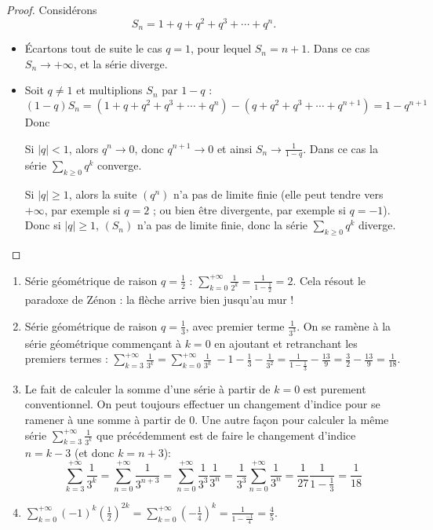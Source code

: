 \documentclass[class=report,crop=false]{standalone}
\begin{document}
\begin{proof}

Considérons 
$$S_n=1+q+q^2+q^3+\cdots+q^n.$$

\begin{itemize}
  \item \'Ecartons tout de suite le cas $q=1$, pour lequel $S_n = n+1$.
Dans ce cas $S_n \to +\infty$, et la série diverge.
  
  \item Soit $q \neq 1$ et multiplions $S_n$ par $1-q$ :
$$(1-q)S_n=(1+q+q^2+q^3+\cdots+q^n)-(q+q^2+q^3+\cdots+q^{n+1})=1-q^{n+1}$$
Donc

Si $|q|<1$, alors $q^n \to 0$, donc $q^{n+1} \to 0$ et ainsi $S_n \to \frac{1}{1-q}$.
Dans ce cas la série $\sum_{k \ge 0} q^k$ converge.

Si $|q| \ge 1$, alors la suite $(q^n)$ n'a pas de limite finie
(elle peut tendre vers $+\infty$, par exemple si $q=2$ ;
ou bien être divergente, par exemple si $q=-1$).
Donc si $|q| \ge 1$, $(S_n)$ n'a pas de limite finie, donc la série 
$\sum_{k \ge 0} q^k$ diverge.
\end{itemize}
\end{proof}


\begin{exemple}
\begin{enumerate}
  \item Série géométrique de raison $q=\frac 12$ : \quad 
  $\displaystyle \sum_{k=0}^{+\infty} \frac{1}{2^k} = \frac{1}{1-\frac12} = 2$.
  Cela résout le paradoxe de Zénon : la flèche arrive bien jusqu'au mur !

  
  \item Série géométrique de raison $q=\frac 13$, avec premier terme $\frac{1}{3^3}$. 
  On se ramène à la série géométrique commençant à $k=0$ en ajoutant et retranchant les premiers termes :
  $\displaystyle \sum_{k=3}^{+\infty} \frac{1}{3^k} = \sum_{k=0}^{+\infty} \frac{1}{3^k} \  -  1 - \frac 13-\frac 1{3^2} 
  = \frac{1}{1-\frac13} - \frac{13}{9}= \frac32-\frac{13}{9} = \frac{1}{18}$.
  
  \item Le fait de calculer la somme d'une série à partir de $k=0$ est
purement conventionnel. On peut toujours effectuer un changement
d'indice pour se ramener à une somme à partir de $0$. Une autre façon pour calculer la même série 
$\displaystyle \sum_{k=3}^{+\infty} \frac{1}{3^k}$ que précédemment
est de faire le changement d'indice $n=k-3$ (et donc $k=n+3$):
$$\sum_{k=3}^{+\infty} \frac{1}{3^k} 
= \sum_{n=0}^{+\infty} \frac{1}{3^{n+3}}
= \sum_{n=0}^{+\infty} \frac{1}{3^3}\frac{1}{3^n}
= \frac{1}{3^3}\sum_{n=0}^{+\infty} \frac{1}{3^n}
= \frac{1}{27}\frac{1}{1-\frac13}
= \frac{1}{18}$$


  \item $\displaystyle \sum_{k=0} ^{+\infty} (-1)^k \left(\frac{1}{2}\right)^{2k}
  =\sum_{k=0} ^{+\infty} \left(-\frac{1}{4}\right)^k=\frac{1}{1-\frac{-1}{4}}=\frac{4}{5}.$
 
\end{enumerate}
\end{exemple}
\end{document}
